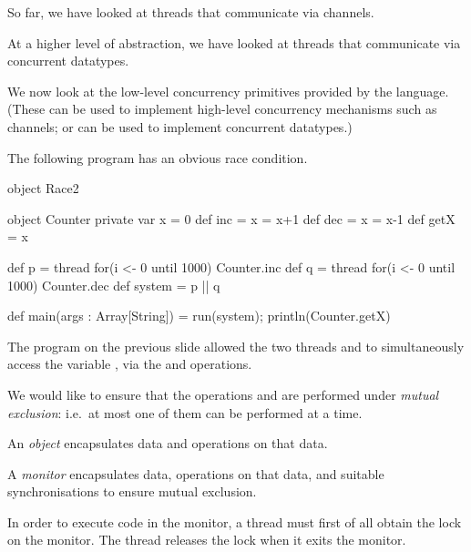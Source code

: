 
\begin{slide}

So far, we have looked at threads that communicate via channels.

At a higher level of abstraction, we have looked at threads that communicate
via concurrent datatypes. 

We now look at the low-level concurrency primitives provided by the language.
(These can be used to implement high-level concurrency mechanisms such as
channels; or can be used to implement concurrent datatypes.) 
\end{slide}


\begin{slide}

The following program has an obvious race condition.
%
\begin{scala}
object Race2{
  object Counter{
    private var x = 0
    def inc = x = x+1
    def dec = x = x-1
    def getX = x
  }

  def p = thread{ for(i <- 0 until 1000) Counter.inc }
  def q = thread{ for(i <- 0 until 1000) Counter.dec }
  def system = p || q

  def main(args : Array[String]) = { run(system); println(Counter.getX) }
}
\end{scala}
\end{slide}


\begin{slide}

The program on the previous slide allowed the two threads  and
 to simultaneously access the variable , via the
 and  operations.

We would like to ensure that the operations  and  are
performed under \emph{mutual exclusion}: i.e.~at most one of them can be
performed at a time.  
\end{slide}


\begin{slide}

An \emph{object} encapsulates data and operations on that data.

A \emph{monitor} encapsulates data, operations on that data, and suitable
synchronisations to ensure mutual exclusion.

In order to execute code in the monitor, a thread must first of all obtain the
lock on the monitor.  The thread releases the lock when it exits the monitor.
\end{slide}

